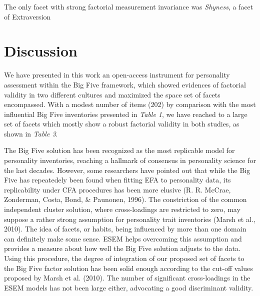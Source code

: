 \documentclass[,man,floatsintext]{apa6}
\begin{document}
The only facet with strong factorial measurement invariance was
\emph{Shyness}, a facet of Extraversion

\vspace{5mm}

\vspace{5mm}

\section{Discussion}\label{discussion}

We have presented in this work an open-access instrument for personality
assessment within the Big Five framework, which showed evidences of
factorial validity in two different cultures and maximized the space set
of facets encompassed. With a modest number of items (202) by comparison
with the most influential Big Five inventories presented in \emph{Table
1}, we have reached to a large set of facets which mostly show a robust
factorial validity in both studies, as shown in \emph{Table 3}.

The Big Five solution has been recognized as the most replicable model
for personality inventories, reaching a hallmark of consensus in
personality science for the last decades. However, some researchers have
pointed out that while the Big Five has repeatedely been found when
fitting EFA to personality data, its replicability under CFA procedures
has been more elusive (R. R. McCrae, Zonderman, Costa, Bond, \&
Paunonen, 1996). The constriction of the common independent cluster
solution, where cross-loadings are restricted to zero, may suppose a
rather strong assumption for personality trait inventories (Marsh et
al., 2010). The idea of facets, or habits, being influenced by more than
one domain can definitely make some sense. ESEM helps overcoming this
assumption and provides a measure about how well the Big Five solution
adjusts to the data. Using this procedure, the degree of integration of
our proposed set of facets to the Big Five factor solution has been
solid enough according to the cut-off values proposed by Marsh et al.
(2010). The number of significant cross-loadings in the ESEM models has
not been large either, advocating a good discriminant validity.
\end{document}
